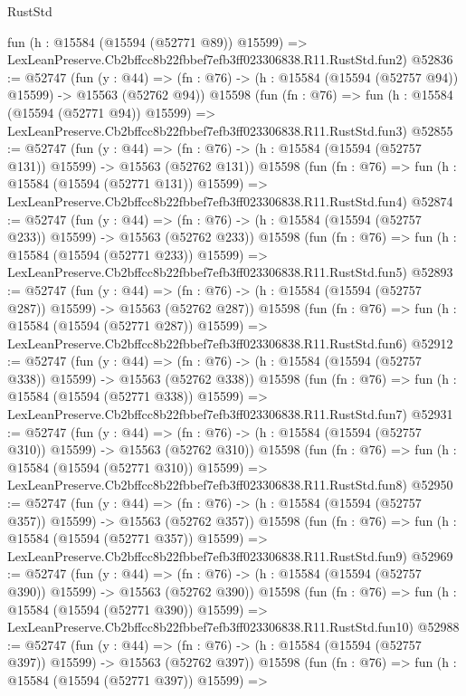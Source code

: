 \begin{lexlean}{RustStd}
\begin{coremodule}
    fun (h : @15584 (@15594 (@52771 @89)) @15599) =>
    LexLeanPreserve.Cb2bffcc8b22fbbef7efb3ff023306838.R11.RustStd.fun2)
@52836 := @52747
    (fun (y : @44) =>
    (fn : @76) -> (h : @15584 (@15594 (@52757 @94)) @15599) -> @15563 (@52762 @94))
    @15598
    (fun (fn : @76) =>
    fun (h : @15584 (@15594 (@52771 @94)) @15599) =>
    LexLeanPreserve.Cb2bffcc8b22fbbef7efb3ff023306838.R11.RustStd.fun3)
@52855 := @52747
    (fun (y : @44) =>
    (fn : @76) -> (h : @15584 (@15594 (@52757 @131)) @15599) -> @15563 (@52762 @131))
    @15598
    (fun (fn : @76) =>
    fun (h : @15584 (@15594 (@52771 @131)) @15599) =>
    LexLeanPreserve.Cb2bffcc8b22fbbef7efb3ff023306838.R11.RustStd.fun4)
@52874 := @52747
    (fun (y : @44) =>
    (fn : @76) -> (h : @15584 (@15594 (@52757 @233)) @15599) -> @15563 (@52762 @233))
    @15598
    (fun (fn : @76) =>
    fun (h : @15584 (@15594 (@52771 @233)) @15599) =>
    LexLeanPreserve.Cb2bffcc8b22fbbef7efb3ff023306838.R11.RustStd.fun5)
@52893 := @52747
    (fun (y : @44) =>
    (fn : @76) -> (h : @15584 (@15594 (@52757 @287)) @15599) -> @15563 (@52762 @287))
    @15598
    (fun (fn : @76) =>
    fun (h : @15584 (@15594 (@52771 @287)) @15599) =>
    LexLeanPreserve.Cb2bffcc8b22fbbef7efb3ff023306838.R11.RustStd.fun6)
@52912 := @52747
    (fun (y : @44) =>
    (fn : @76) -> (h : @15584 (@15594 (@52757 @338)) @15599) -> @15563 (@52762 @338))
    @15598
    (fun (fn : @76) =>
    fun (h : @15584 (@15594 (@52771 @338)) @15599) =>
    LexLeanPreserve.Cb2bffcc8b22fbbef7efb3ff023306838.R11.RustStd.fun7)
@52931 := @52747
    (fun (y : @44) =>
    (fn : @76) -> (h : @15584 (@15594 (@52757 @310)) @15599) -> @15563 (@52762 @310))
    @15598
    (fun (fn : @76) =>
    fun (h : @15584 (@15594 (@52771 @310)) @15599) =>
    LexLeanPreserve.Cb2bffcc8b22fbbef7efb3ff023306838.R11.RustStd.fun8)
@52950 := @52747
    (fun (y : @44) =>
    (fn : @76) -> (h : @15584 (@15594 (@52757 @357)) @15599) -> @15563 (@52762 @357))
    @15598
    (fun (fn : @76) =>
    fun (h : @15584 (@15594 (@52771 @357)) @15599) =>
    LexLeanPreserve.Cb2bffcc8b22fbbef7efb3ff023306838.R11.RustStd.fun9)
@52969 := @52747
    (fun (y : @44) =>
    (fn : @76) -> (h : @15584 (@15594 (@52757 @390)) @15599) -> @15563 (@52762 @390))
    @15598
    (fun (fn : @76) =>
    fun (h : @15584 (@15594 (@52771 @390)) @15599) =>
    LexLeanPreserve.Cb2bffcc8b22fbbef7efb3ff023306838.R11.RustStd.fun10)
@52988 := @52747
    (fun (y : @44) =>
    (fn : @76) -> (h : @15584 (@15594 (@52757 @397)) @15599) -> @15563 (@52762 @397))
    @15598
    (fun (fn : @76) =>
    fun (h : @15584 (@15594 (@52771 @397)) @15599) =>

\end{coremodule}
\end{lexlean}
